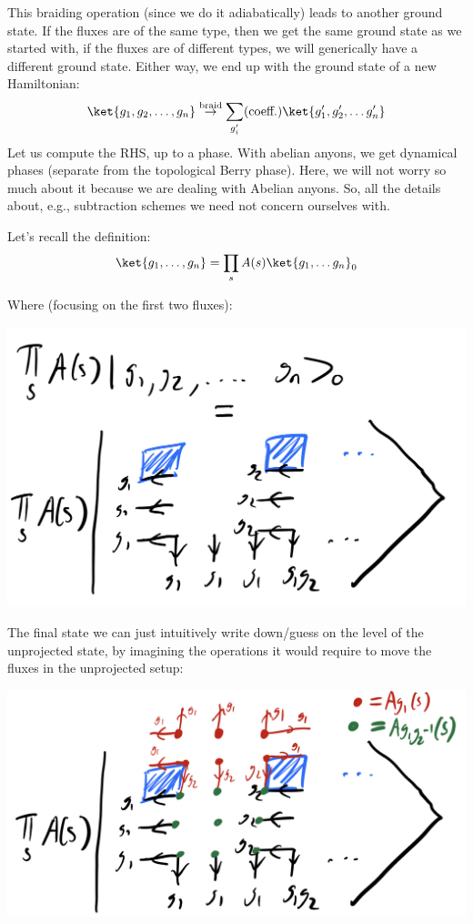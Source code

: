 This braiding operation (since we do it adiabatically) leads to another ground state. If the fluxes are of the same type, then we get the same ground state as we started with, if the fluxes are of different types, we will generically have a different ground state. Either way, we end up with the ground state of a new Hamiltonian:
\begin{equation}
    \ket{g_1, g_2, \ldots, g_n} \stackrel{\text{braid}}{\to} \sum_{g_i'}(\text{coeff.})\ket{g_1', g_2', \ldots g_n'}
\end{equation}
Let us compute the RHS, up to a phase. With abelian anyons, we get dynamical phases (separate from the topological Berry phase). Here, we will not worry so much about it because we are dealing with Abelian anyons. So, all the details about, e.g., subtraction schemes we need not concern ourselves with.

Let's recall the definition:
\begin{equation}
    \ket{g_1, \ldots, g_n} = \prod_s A(s)\ket{g_1, \ldots g_n}_0
\end{equation}

Where (focusing on the first two fluxes):

\begin{center}
    \includegraphics[scale=0.35]{Lectures/Images/lec10-gstate.png}
\end{center}

The final state we can just intuitively write down/guess on the level of the unprojected state, by imagining the operations it would require to move the fluxes in the unprojected setup:

\begin{center}
    \includegraphics[scale=0.35]{Lectures/Images/lec10-gstategaugeequiv.png}
\end{center}

